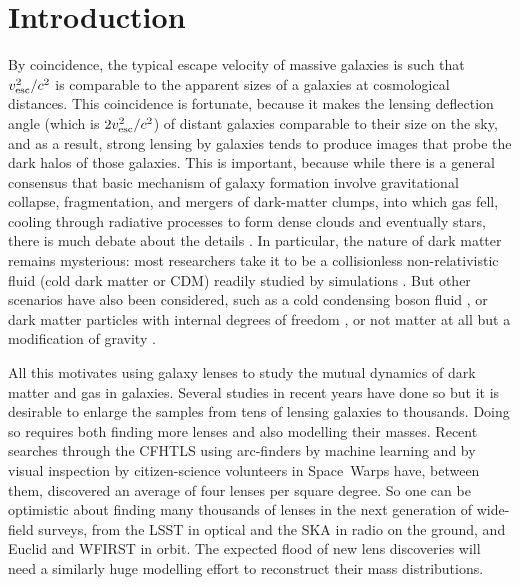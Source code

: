 \section{Introduction}

By coincidence, the typical escape velocity of massive galaxies is
such that $v_{\rm esc}^2/c^2$ is comparable to the apparent sizes of a
galaxies at cosmological distances.  This coincidence is fortunate,
because it makes the lensing deflection angle (which is $2v_{\rm
  esc}^2/c^2$) of distant galaxies comparable to their size on the
sky, and as a result, strong lensing by galaxies tends to produce
images that probe the dark halos of those galaxies.  This is
important, because while there is a general consensus that basic
mechanism of galaxy formation involve gravitational collapse,
fragmentation, and mergers of dark-matter clumps, into which gas fell,
cooling through radiative processes to form dense clouds and
eventually stars, there is much debate about the details \citep[for a
  summary, see][]{2012RAA....12..917S}.  In particular, the nature of
dark matter remains mysterious: most researchers take it to be a
collisionless non-relativistic fluid (cold dark matter or CDM) readily
studied by simulations \citep[for example, the millenium simulation
  by][which has been particularly influential]{2005Natur.435..629S}.
But other scenarios have also been considered, such as a cold
condensing boson fluid \citep{2016ApJ...818...89S}, or dark matter
particles with internal degrees of freedom
\citep{2010MNRAS.405...77S}, or not matter at all but a modification
of gravity \citep{2016PhRvL.117t1101M}.

All this motivates using galaxy lenses to study the mutual dynamics of
dark matter and gas in galaxies.  Several studies in recent years have
done so
\citep{2009ApJ...703L..51K,2011ApJ...740...97L,2012MNRAS.424..104L,
  2016MNRAS.459.3677L,2016MNRAS.456..870B} but it is desirable to
enlarge the samples from tens of lensing galaxies to thousands.  Doing
so requires both finding more lenses and also modelling their masses.
Recent searches through the CFHTLS \citep{2012SPIE.8448E..0MC} using
arc-finders
\citep{2012ApJ...749...38M,2014A&A...567A.111M,2014ApJ...785..144G} by
machine learning \citep{2016A&A...592A..75P} and by visual inspection
by citizen-science volunteers in Space~Warps
\citep{2016MNRAS.455.1191M} have, between them, discovered an average
of four lenses per square degree.  So one can be optimistic about
finding many thousands of lenses in the next generation of wide-field
surveys, from the LSST in optical and the SKA in radio on the ground,
and Euclid and WFIRST in orbit.  The expected flood of new lens
discoveries will need a similarly huge modelling effort to reconstruct
their mass distributions.


